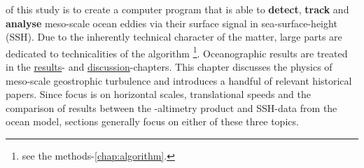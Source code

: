   of this study is to create a computer program that is able to \textbf{detect}, \textbf{track} and \textbf{analyse} meso-scale ocean eddies via their surface signal in sea-surface-height (SSH). Due to the inherently technical character of the matter, large parts are dedicated to technicalities of the algorithm \footnote{see the methods-\cref{chap:algorithm}.}. Oceanographic results are treated in the \href{chap:results}{results}- and \href{chap:discussion}{discussion}-chapters. This chapter discusses the physics of meso-scale geostrophic turbulence and introduces a handful of relevant historical papers. Since focus is on horizontal scales, translational speeds and the comparison of results between the \AVISO-altimetry product and SSH-data from the \POP ocean model, sections generally focus on either of these three topics.     
